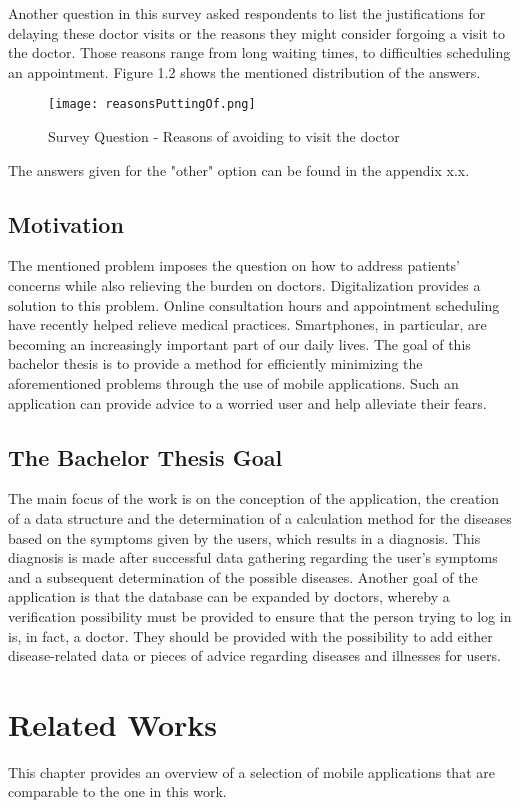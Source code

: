 \noindent 
Another question in this survey asked respondents to list the justifications for delaying these doctor visits or the reasons they might consider forgoing a visit to the doctor.
Those reasons range from long waiting times, to difficulties scheduling an appointment. Figure 1.2 shows the mentioned distribution of the answers.
\begin{figure}[H]
	\centering
	\texttt{[image: reasonsPuttingOf.png]}
	\caption[Survey Question]{Survey Question - Reasons of avoiding to visit the doctor}
\end{figure}
\noindent 
The answers given for the "other" option can be found in the appendix x.x.
\section{Motivation}
The mentioned problem imposes the question on how to address patients’ concerns while also relieving the burden on doctors. Digitalization provides a solution to this problem. Online consultation hours and appointment scheduling have recently helped relieve medical practices. Smartphones, in particular, are becoming an increasingly important part of our daily lives. The goal of this bachelor thesis is to provide a method for efficiently minimizing the aforementioned problems through the use of mobile applications. Such an application can provide advice to a worried user and help alleviate their fears.

\section{The Bachelor Thesis Goal}
The main focus of the work is on the conception of the application, the creation of a data structure and the determination of a calculation method for the diseases based on the symptoms given by the users, which results in a diagnosis. This diagnosis is made after successful data gathering regarding the user's symptoms and a subsequent determination of the possible diseases. Another goal of the application is that the database can be expanded by doctors, whereby a verification possibility must be provided to ensure that the person trying to log in is, in fact, a doctor. They should be provided with the possibility to add either disease-related data or pieces of advice regarding diseases and illnesses for users. 

\chapter{Related Works}
This chapter provides an overview of a selection of mobile applications that are comparable to the one in this work.
